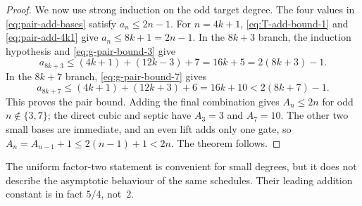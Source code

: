 \begin{proof}
We now use strong induction on the odd target degree.  The four values in
\eqref{eq:pair-add-bases} satisfy $a_n\le2n-1$.  For $n=4k+1$,
\eqref{eq:T-add-bound-1} and \eqref{eq:pair-add-4k1} give
$a_n\le8k+1=2n-1$.  In the $8k+3$ branch, the induction hypothesis and
\eqref{eq:g-pair-bound-3} give
\[
 a_{8k+3}\le(4k+1)+(12k-3)+7=16k+5=2(8k+3)-1.
\]
In the $8k+7$ branch, \eqref{eq:g-pair-bound-7} gives
\[
 a_{8k+7}\le(4k+1)+(12k+3)+6
     =16k+10<2(8k+7)-1.
\]
This proves the pair bound.  Adding the final combination gives
$A_n\le2n$ for odd $n\notin\{3,7\}$; the direct cubic and septic have
$A_3=3$ and $A_7=10$.  The other two small bases are immediate, and an
even lift adds only one gate, so
$A_n=A_{n-1}+1\le2(n-1)+1<2n$.  The theorem follows.
\end{proof}

The uniform factor-two statement is convenient for small degrees, but it
does not describe the asymptotic behaviour of the same schedules.  Their
leading addition constant is in fact $5/4$, not~$2$.

